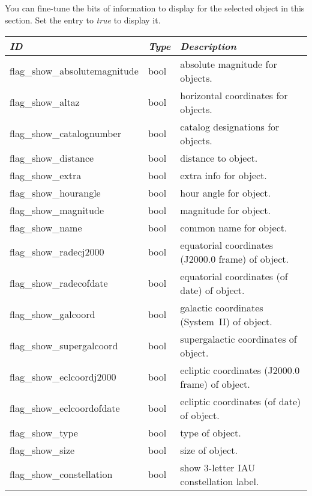 \subsection{}
\label{sec:config.ini:custom_selected_info}

You can fine-tune the bits of information to display for the selected object in this section. Set the entry to \emph{true} to display it.

\begin{longtabu} to \textwidth {l|l|X}\toprule
\emph{ID} & \emph{Type} & \emph{Description}\\\midrule
flag\_show\_absolutemagnitude & bool & absolute magnitude for objects.\\\midrule
flag\_show\_altaz             & bool & horizontal coordinates for objects.\\\midrule
flag\_show\_catalognumber     & bool & catalog designations for objects.\\\midrule
flag\_show\_distance          & bool & distance to object.\\\midrule
flag\_show\_extra             & bool & extra info for object.\\\midrule
flag\_show\_hourangle         & bool & hour angle for object.\\\midrule
flag\_show\_magnitude         & bool & magnitude for object.\\\midrule
flag\_show\_name              & bool & common name for object.\\\midrule
flag\_show\_radecj2000        & bool & equatorial coordinates (J2000.0 frame) of object.\\\midrule
flag\_show\_radecofdate       & bool & equatorial coordinates (of date) of object.\\\midrule
flag\_show\_galcoord          & bool & galactic coordinates (System~II) of object.\\\midrule
flag\_show\_supergalcoord     & bool & supergalactic coordinates of object.\\\midrule
flag\_show\_eclcoordj2000     & bool & ecliptic coordinates (J2000.0 frame) of object.\\\midrule
flag\_show\_eclcoordofdate    & bool & ecliptic coordinates (of date) of object.\\\midrule
flag\_show\_type              & bool & type of object.\\\midrule
flag\_show\_size              & bool & size of object.\\\midrule
flag\_show\_constellation     & bool & show 3-letter IAU constellation label.\\\bottomrule
\end{longtabu}

